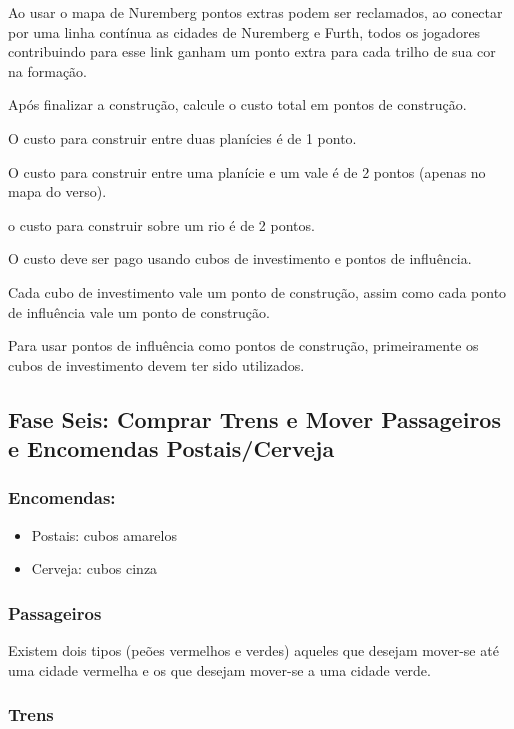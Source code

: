 \documentclass[11pt]{article}
\begin{document}
Ao usar o mapa de Nuremberg pontos extras podem ser reclamados, ao conectar por uma linha contínua as cidades de Nuremberg e Furth, todos os jogadores contribuindo para esse link ganham um ponto extra para
cada trilho de sua cor na formação.

Após finalizar a construção, calcule o custo total em pontos de construção.

O custo para construir entre duas planícies é de 1 ponto.

O custo para construir entre uma planície e um vale é de 2 pontos (apenas no mapa do verso).

o custo para construir sobre um rio é de 2 pontos.

O custo deve ser pago usando cubos de investimento e pontos de influência.

Cada cubo de investimento vale um ponto de construção, assim como cada ponto de influência vale um ponto de construção.

Para usar pontos de influência como pontos de construção, primeiramente os cubos de investimento devem ter sido utilizados.

\subsection{Fase Seis: Comprar Trens e Mover Passageiros e Encomendas Postais/Cerveja}
\label{sec:org9711993}

\subsubsection{Encomendas:}
\label{sec:org7722203}

\begin{itemize}
\item Postais: cubos amarelos
\item Cerveja: cubos cinza
\end{itemize}

\subsubsection{Passageiros}
\label{sec:org4791857}

Existem dois tipos (peões vermelhos e verdes) aqueles que desejam mover-se até uma cidade vermelha e os que desejam mover-se a uma cidade verde.


\subsubsection{Trens}
\label{sec:orgb7ca519}
\end{document}
